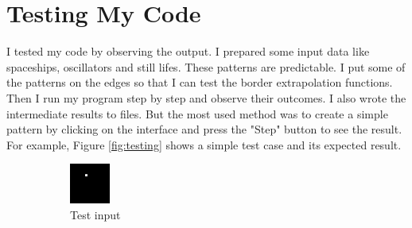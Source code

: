 \documentclass[12pt,a4paper]{article}
\begin{document}
\section{Testing My Code}
I tested my code by observing the output. I prepared some input data like spaceships, oscillators and still lifes. These patterns are predictable. I put some of the patterns on the edges so that I can test the border extrapolation functions. Then I run my program step by step and observe their outcomes. I also wrote the intermediate results to files. But the most used method was to create a simple pattern by clicking on the interface and press the "Step" button to see the result. For example, Figure \ref{fig:testing} shows a simple test case and its expected result.
\begin{figure}[h!]
        \centering
        \begin{subfigure}[b]{0.5\textwidth}
                \includegraphics[width=\textwidth]{../test/test1}
                \caption{Test input}
        \end{subfigure}%
        ~ %
        \begin{subfigure}[b]{0.5\textwidth}

\end{subfigure}
\end{figure}
\end{document}

